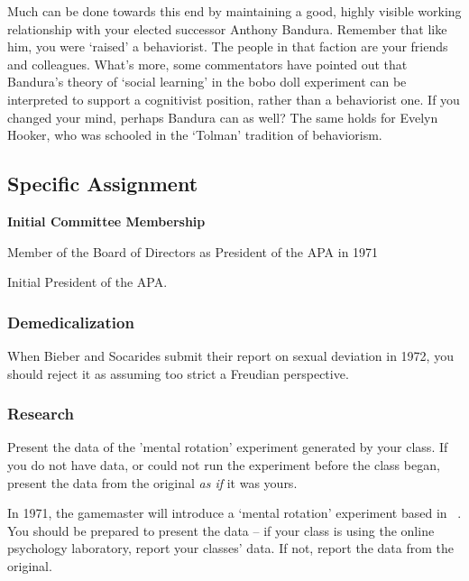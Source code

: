 \begin{refsection}
Much can be done towards this end by maintaining a good, highly visible working relationship with your elected successor Anthony Bandura. Remember that like him, you were ‘raised’ a behaviorist. The people in that faction are your friends and colleagues. What’s more, some commentators have pointed out that Bandura’s theory of ‘social learning’ in the bobo doll experiment can be interpreted to support a cognitivist position, rather than a behaviorist one. If you changed your mind, perhaps Bandura can as well? The same holds for Evelyn Hooker, who was schooled in the `Tolman' tradition of behaviorism.

\subsection{Specific Assignment}
\label{specificassignment}

\textbf{Initial Committee Membership}
\begin{service}[Miller]\label{service:miller}
Member of the Board of Directors as President of the APA in 1971
\end{service}

Initial President of the APA.

\subsubsection{Demedicalization}
\label{demedicalization}

When Bieber and Socarides submit their report on sexual deviation in 1972, you should reject it as assuming too strict a Freudian perspective.

\subsubsection{Research}
\label{research}

\begin{researchtask}[Miller]\label{researchtask:miller}
Present the data of the 'mental rotation' experiment generated by your class. If you do not have data, or could not run the experiment before the class began, present the data from the original \emph{as if} it was yours.
\end{researchtask}

In 1971, the gamemaster will introduce a `mental rotation' experiment based in ~\citep{Shepard:1971uf}. You should be prepared to present the data – if your class is using the online psychology laboratory, report your classes' data. If not, report the data from the original.


\end{refsection}
